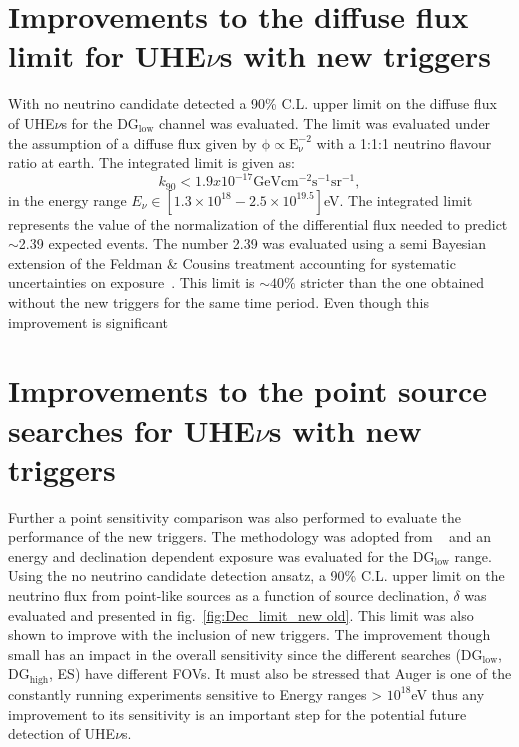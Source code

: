 \section*{Improvements to the diffuse flux limit for UHE$\nu$s with new triggers}
With no neutrino candidate detected a 90\% C.L. upper limit on the diffuse flux of UHE$\nu$s for the DG$\mathrm{_{low}}$ channel was evaluated. The limit was evaluated under the assumption of a diffuse flux given by $\mathrm{\phi \propto E_{\nu}^{-2}}$ with a 1:1:1 neutrino flavour ratio at earth. The integrated limit is given as:
\begin{equation}
    k_{90} < 1.9 x 10^{-17} \mathrm{GeV cm^{-2} s^{-1} sr^{-1}},
\end{equation}
in the energy range $E_{\nu} \in [1.3 \times 10^{18} - 2.5 \times 10^{19.5}]$eV. The integrated limit represents the value of the normalization of the differential flux needed to predict $\sim$2.39 expected events. The number 2.39 was evaluated using a semi Bayesian extension of the Feldman \& Cousins treatment accounting for systematic uncertainties on exposure~\cite{Conrad:2002kn}. This limit is $\sim 40\%$ stricter than the one obtained without the new triggers for the same time period. Even though this improvement is significant 
\section*{Improvements to the point source searches for UHE$\nu$s with new triggers}
Further a point sensitivity comparison was also performed to evaluate the performance of the new triggers. The methodology was adopted from ~\cite{Aab_2019_point} and an energy and declination dependent exposure was evaluated for the DG$\mathrm{_{low}}$ range. Using the no neutrino candidate detection ansatz, a 90\% C.L. upper limit on the neutrino flux from point-like sources as a function of source declination, $\delta$ was evaluated and presented in fig.~\ref{fig:Dec_limit_new old}. This limit was also shown to improve with the inclusion of new triggers. The improvement though small has an impact in the overall sensitivity since the different searches (DG$\mathrm{_{low}}$, DG$\mathrm{_{high}}$, ES) have different FOVs. It must also be stressed that Auger is one of the constantly running experiments sensitive to Energy ranges > $10^{18}$eV thus any improvement to its sensitivity is an important step for the potential future detection of UHE$\nu$s.



